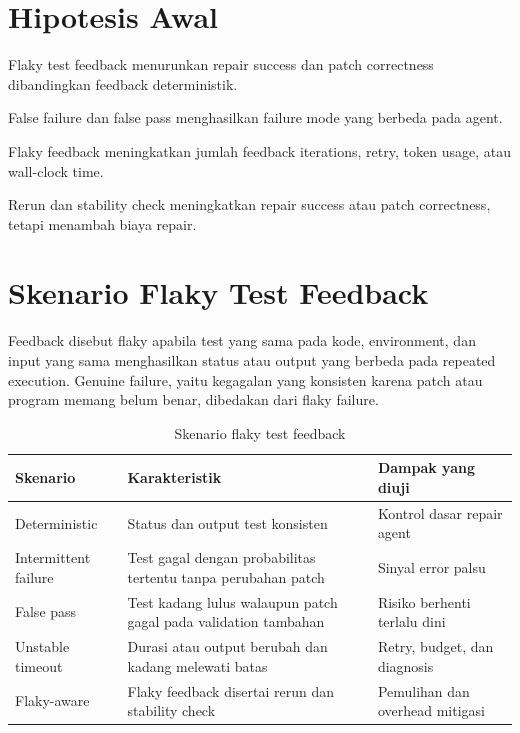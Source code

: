 \section{Hipotesis Awal}

\begin{description}[leftmargin=!,labelwidth=3.5cm]
    \item[H1] Flaky test feedback menurunkan repair success dan patch correctness dibandingkan feedback deterministik.
    \item[H2] False failure dan false pass menghasilkan failure mode yang berbeda pada agent.
    \item[H3] Flaky feedback meningkatkan jumlah feedback iterations, retry, token usage, atau wall-clock time.
    \item[H4] Rerun dan stability check meningkatkan repair success atau patch correctness, tetapi menambah biaya repair.
\end{description}

\section{Skenario Flaky Test Feedback}

Feedback disebut flaky apabila test yang sama pada kode, environment, dan input yang sama menghasilkan status atau output yang berbeda pada repeated execution. Genuine failure, yaitu kegagalan yang konsisten karena patch atau program memang belum benar, dibedakan dari flaky failure.

\begin{table}[htbp]
\centering
\small
\caption{Skenario flaky test feedback}
\label{tab:scenarios}
\begin{tabularx}{\textwidth}{p{3.2cm}YY}
\toprule
\textbf{Skenario} & \textbf{Karakteristik} & \textbf{Dampak yang diuji} \\
\midrule
Deterministic & Status dan output test konsisten & Kontrol dasar repair agent \\
Intermittent failure & Test gagal dengan probabilitas tertentu tanpa perubahan patch & Sinyal error palsu \\
False pass & Test kadang lulus walaupun patch gagal pada validation tambahan & Risiko berhenti terlalu dini \\
Unstable timeout & Durasi atau output berubah dan kadang melewati batas & Retry, budget, dan diagnosis \\
Flaky-aware & Flaky feedback disertai rerun dan stability check & Pemulihan dan overhead mitigasi \\
\bottomrule
\end{tabularx}
\end{table}

